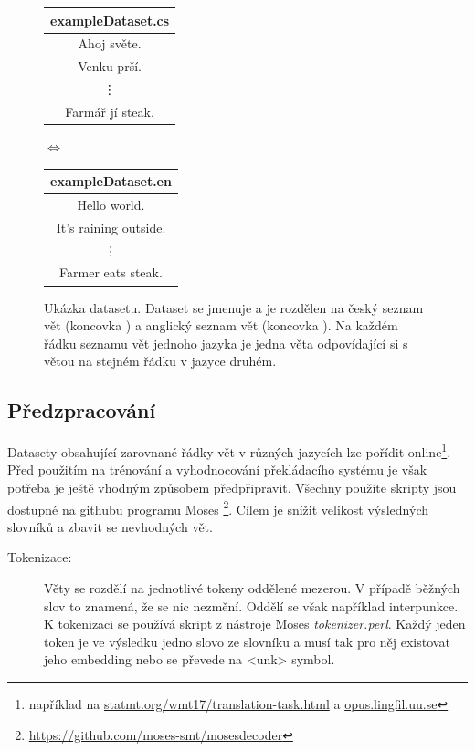 \begin{figure}[h]
    \begin{center}
        \begin{tabular}{|c|}
          \hline
          exampleDataset.cs\\
          \hline
          Ahoj světe. \\
          Venku prší. \\
          \vdots \\
          Farmář jí steak. \\
          \hline
        \end{tabular}
        $\Longleftrightarrow$
        \begin{tabular}{|c|}
          \hline
          exampleDataset.en\\
          \hline
          Hello world. \\
          It's raining outside. \\
          \vdots \\
          Farmer eats steak. \\
          \hline
        \end{tabular}
    \end{center}
	\caption{Ukázka datasetu. Dataset se jmenuje  a je rozdělen na český seznam vět (koncovka ) a anglický seznam vět (koncovka ). Na každém řádku seznamu vět jednoho jazyka je jedna věta odpovídající si s větou na stejném řádku v jazyce druhém.}
	\label{img:dataset}
\end{figure}

\subsection{Předzpracování} \label{subsection:preparing}
Datasety obsahující zarovnané řádky vět v různých jazycích lze pořídit online\footnote{například na \url{statmt.org/wmt17/translation-task.html} a \url{opus.lingfil.uu.se}}. Před použitím na trénování a vyhodnocování překládacího systému je však potřeba je ještě vhodným způsobem předpřipravit. Všechny použíte skripty jsou dostupné na githubu programu Moses \footnote{\url{https://github.com/moses-smt/mosesdecoder}}. Cílem je snížit velikost výsledných slovníků a zbavit se nevhodných vět.

\begin{description}
  \item[Tokenizace:] Věty se rozdělí na jednotlivé tokeny oddělené mezerou. V případě běžných slov to znamená, že se nic nezmění. Oddělí se však například interpunkce. K tokenizaci se používá skript z nástroje Moses \emph{tokenizer.perl}. Každý jeden token je ve výsledku jedno slovo ze slovníku a musí tak pro něj existovat jeho embedding nebo se převede na <unk> symbol.
\end{description}

